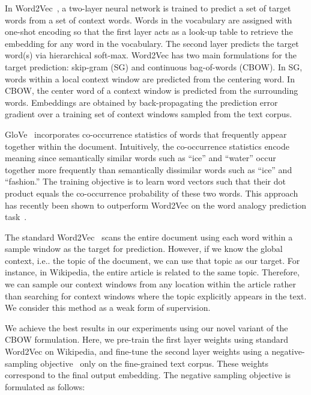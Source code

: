 \documentclass[10pt,twocolumn,letterpaper]{article}
\makeatletter
\newcommand{\myparagraph}[1]{\vspace{2pt}\noindent{\bf #1}}
\DeclareRobustCommand\onedot{\futurelet\@let@token\@onedot}
\def\@onedot{\ifx\@let@token.\else.\null\fi\xspace}
\def\ie{{i.e}\onedot} \def\Ie{{I.e}\onedot}
\makeatother
\begin{document}
\myparagraph{Word2Vec ().} In Word2Vec~\cite{MSCCD13}, a two-layer neural network is trained to predict a set of target words from a set of context words. Words in the vocabulary are assigned with one-shot encoding so that the first layer  acts as a look-up table to retrieve the embedding for any word in the vocabulary. The second layer predicts the target word(s) via hierarchical soft-max. Word2Vec has two main formulations for the target prediction: skip-gram (SG) and continuous bag-of-words (CBOW). In SG, words within a local context window are predicted from the centering word. In CBOW, the center word of a context window is predicted from the surrounding words. Embeddings are obtained by back-propagating the prediction error gradient over a training set of context windows sampled from the text corpus.

\myparagraph{GloVe ().} GloVe~\cite{PSM14} incorporates co-occurrence statistics of words that frequently appear together within the document. Intuitively, the co-occurrence statistics encode meaning since semantically similar words such as ``ice'' and ``water'' occur together more frequently than semantically dissimilar words such as ``ice'' and ``fashion.'' The training objective is to learn word vectors such that their dot product equals the co-occurrence probability of these two words. This approach has recently been shown to outperform Word2Vec on the word analogy prediction task~\cite{PSM14}.

\myparagraph{Weakly-supervised Word2Vec ().} The standard Word2Vec~\cite{MSCCD13} scans the entire document using each word within a sample window as the target for prediction. However, if we know the global context, \ie the topic of the document, we can use that topic as our target. For instance, in Wikipedia, the entire article is related to the same topic. Therefore, we can sample our context windows from any location within the article rather than searching for context windows where the topic explicitly appears in the text. We consider this method as a weak form of supervision.

We achieve the best results in our experiments using our novel variant of the CBOW formulation. Here, we pre-train the first layer weights using standard Word2Vec on Wikipedia, and fine-tune the second layer weights using a negative-sampling objective~\cite{goldberg2014word2vec} only on the fine-grained text corpus. These weights correspond to the final output embedding. The negative sampling objective is formulated as follows:
\end{document}
